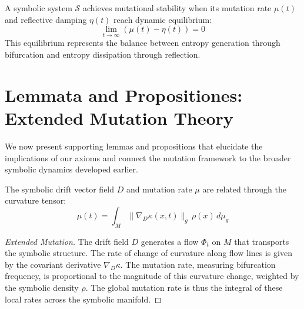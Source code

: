 \begin{axiom}
\label{axiom:bk6_equilibrium_of_mutability}
A symbolic system $\mathcal{S}$ achieves mutational stability when its mutation rate $\mu(t)$ and reflective damping $\eta(t)$ reach dynamic equilibrium:
\begin{equation}
\lim_{t \to \infty} (\mu(t) - \eta(t)) = 0
\end{equation}
This equilibrium represents the balance between entropy generation through bifurcation and entropy dissipation through reflection.
\end{axiom}
\section{Lemmata and Propositiones: Extended Mutation Theory}
\label{sec:bk6_lemmata_and_propositiones_extended_mutation_theory}
We now present supporting lemmas and propositions that elucidate the implications of our axioms and connect the mutation framework to the broader symbolic dynamics developed earlier.
\begin{lemma}
\label{lemma:bk6_symbolic_drift_mutation_relation}
The symbolic drift vector field $D$ and mutation rate $\mu$ are related through the curvature tensor:
\begin{equation}
\mu(t) = \int_M \|\nabla_{D} \kappa(x,t)\|_g \, \rho(x) \, d\mu_g
\end{equation}
\begin{proof}[Extended Mutation]
\label{proof:bk6_extended_mutation}
The drift field $D$ generates a flow $\Phi_t$ on $M$ that transports the symbolic structure. The rate of change of curvature along flow lines is given by the covariant derivative $\nabla_D \kappa$. The mutation rate, measuring bifurcation frequency, is proportional to the magnitude of this curvature change, weighted by the symbolic density $\rho$. The global mutation rate is thus the integral of these local rates across the symbolic manifold.
\end{proof}
\end{lemma}
